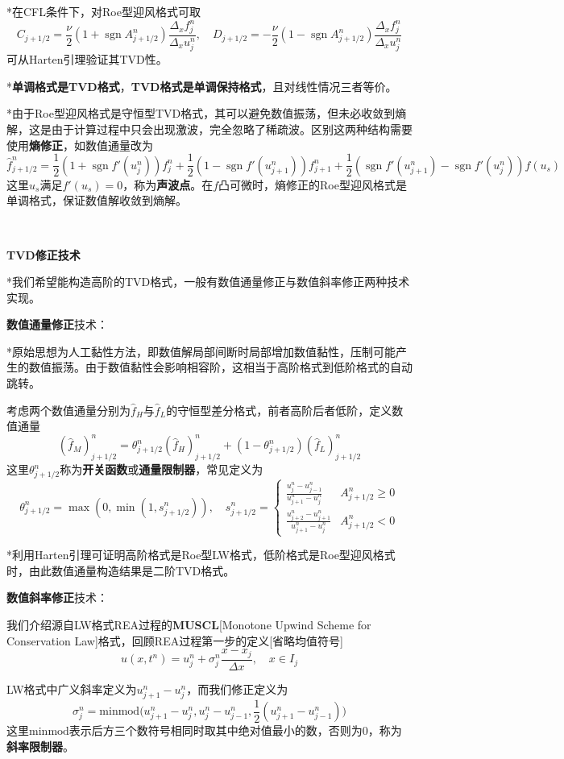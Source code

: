 \documentclass[a4paper,UTF8,fontset=windows]{ctexart}
\DeclareMathOperator{\sgn}{sgn}
\begin{document}
*在CFL条件下，对Roe型迎风格式可取
$$C_{j+1/2}=\frac{\nu}{2}(1+\sgn A_{j+1/2}^n)\frac{\Delta_xf_j^n}{\Delta_xu_j^n},\quad D_{j+1/2}=-\frac{\nu}{2}(1-\sgn A_{j+1/2}^n)\frac{\Delta_xf_j^n}{\Delta_xu_j^n}$$
可从Harten引理验证其TVD性。

*\textbf{单调格式是TVD格式}，\textbf{TVD格式是单调保持格式}，且对线性情况三者等价。

*由于Roe型迎风格式是守恒型TVD格式，其可以避免数值振荡，但未必收敛到熵解，这是由于计算过程中只会出现激波，完全忽略了稀疏波。区别这两种结构需要使用\textbf{熵修正}，如数值通量改为
$$\hat{f}_{j+1/2}^n=\frac{1}{2}(1+\sgn f'(u_j^n))f_j^n+\frac{1}{2}(1-\sgn f'(u_{j+1}^n))f_{j+1}^n+\frac{1}{2}(\sgn f'(u_{j+1}^n)-\sgn f'(u_j^n))f(u_s)$$
这里$u_s$满足$f'(u_s)=0$，称为\textbf{声波点}。在$f$凸可微时，熵修正的Roe型迎风格式是单调格式，保证数值解收敛到熵解。

\

\textbf{TVD修正技术}

*我们希望能构造高阶的TVD格式，一般有数值通量修正与数值斜率修正两种技术实现。

\textbf{数值通量修正}技术：

*原始思想为人工黏性方法，即数值解局部间断时局部增加数值黏性，压制可能产生的数值振荡。由于数值黏性会影响相容阶，这相当于高阶格式到低阶格式的自动跳转。

考虑两个数值通量分别为$\hat{f}_H$与$\hat{f}_L$的守恒型差分格式，前者高阶后者低阶，定义数值通量
$$(\hat{f}_M)_{j+1/2}^n=\theta_{j+1/2}^n(\hat{f}_H)_{j+1/2}^n+(1-\theta_{j+1/2}^n)(\hat{f}_L)_{j+1/2}^n$$
这里$\theta_{j+1/2}^n$称为\textbf{开关函数}或\textbf{通量限制器}，常见定义为
$$\theta_{j+1/2}^n=\max(0,\min(1,s_{j+1/2}^n)),\quad s_{j+1/2}^n=\begin{cases}\frac{u_j^n-u_{j-1}^n}{u_{j+1}^n-u_j^n}&A_{j+1/2}^n\ge0\\\frac{u_{j+2}^n-u_{j+1}^n}{u_{j+1}^n-u_j^n}&A_{j+1/2}^n<0\end{cases}$$

*利用Harten引理可证明高阶格式是Roe型LW格式，低阶格式是Roe型迎风格式时，由此数值通量构造结果是二阶TVD格式。

\textbf{数值斜率修正}技术：

我们介绍源自LW格式REA过程的\textbf{MUSCL}[Monotone Upwind Scheme for Conservation Law]格式，回顾REA过程第一步的定义[省略均值符号]
$$u(x,t^n)=u_j^n+\sigma_j^n\frac{x-x_j}{\Delta x},\quad x\in I_j$$

LW格式中广义斜率定义为$u_{j+1}^n-u_j^n$，而我们修正定义为
$$\sigma_j^n=\mathrm{minmod}\bigg(u_{j+1}^n-u_j^n,u_j^n-u_{j-1}^n,\frac{1}{2}(u_{j+1}^n-u_{j-1}^n)\bigg)$$
这里$\mathrm{minmod}$表示后方三个数符号相同时取其中绝对值最小的数，否则为0，称为\textbf{斜率限制器}。
\end{document}
